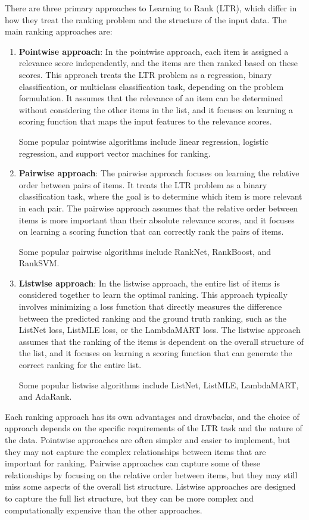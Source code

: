 \documentclass[12pt]{article}
\begin{document}
There are three primary approaches to Learning to Rank (LTR), which differ in how they treat the ranking problem and the structure of the input data. The main ranking approaches are:

\begin{enumerate}
\item \textbf{Pointwise approach}: In the pointwise approach, each item is assigned a relevance score independently, and the items are then ranked based on these scores. This approach treats the LTR problem as a regression, binary classification, or multiclass classification task, depending on the problem formulation. It assumes that the relevance of an item can be determined without considering the other items in the list, and it focuses on learning a scoring function that maps the input features to the relevance scores.

Some popular pointwise algorithms include linear regression, logistic regression, and support vector machines for ranking.

\item \textbf{Pairwise approach}: The pairwise approach focuses on learning the relative order between pairs of items. It treats the LTR problem as a binary classification task, where the goal is to determine which item is more relevant in each pair. The pairwise approach assumes that the relative order between items is more important than their absolute relevance scores, and it focuses on learning a scoring function that can correctly rank the pairs of items.

Some popular pairwise algorithms include RankNet, RankBoost, and RankSVM.

\item \textbf{Listwise approach}: In the listwise approach, the entire list of items is considered together to learn the optimal ranking. This approach typically involves minimizing a loss function that directly measures the difference between the predicted ranking and the ground truth ranking, such as the ListNet loss, ListMLE loss, or the LambdaMART loss. The listwise approach assumes that the ranking of the items is dependent on the overall structure of the list, and it focuses on learning a scoring function that can generate the correct ranking for the entire list.

Some popular listwise algorithms include ListNet, ListMLE, LambdaMART, and AdaRank.

\end{enumerate}
Each ranking approach has its own advantages and drawbacks, and the choice of approach depends on the specific requirements of the LTR task and the nature of the data. Pointwise approaches are often simpler and easier to implement, but they may not capture the complex relationships between items that are important for ranking. Pairwise approaches can capture some of these relationships by focusing on the relative order between items, but they may still miss some aspects of the overall list structure. Listwise approaches are designed to capture the full list structure, but they can be more complex and computationally expensive than the other approaches.
\end{document}
